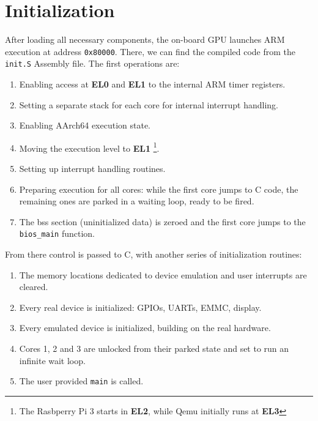 \documentclass[12pt,a4paper,openright,twoside]{report}
\begin{document}
\section{Initialization}
After loading all necessary components, the on-board GPU launches ARM execution at 
address {\tt 0x80000}. There, we can find the compiled code from the 
{\tt init.S} Assembly file.
The first operations are:
\begin{enumerate}
    \item Enabling access at \textbf{EL0} and \textbf{EL1} to the internal ARM 
        timer registers.
    \item Setting a separate stack for each core for internal interrupt handling.
    \item Enabling AArch64 execution state.
    \item Moving the execution level to \textbf{EL1} \footnote{The Rasbperry Pi 3
     starts in \textbf{EL2}, while Qemu initially runs at \textbf{EL3}}.
    \item Setting up interrupt handling routines.
    \item Preparing execution for all cores: while the first core jumps to C code,
        the remaining ones are parked in a waiting loop, ready to be fired.
    \item The bss section (uninitialized data) is zeroed and the first core jumps
        to the {\tt bios\_main} function.
\end{enumerate}

From there control is passed to C, with another series of initialization routines:
\begin{enumerate}
    \item The memory locations dedicated to device emulation and user interrupts
        are cleared.
    \item Every real device is initialized: GPIOs, UARTs, EMMC, display.
    \item Every emulated device is initialized, building on the real hardware.
    \item Cores 1, 2 and 3 are unlocked from their parked state and set to 
        run an infinite wait loop.
    \item The user provided {\tt main} is called.
\end{enumerate}
\end{document}
